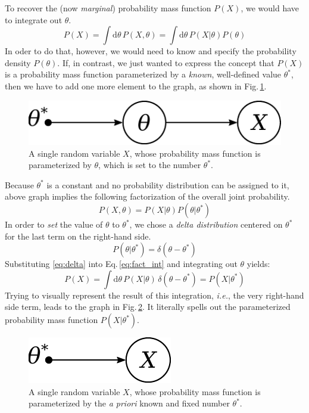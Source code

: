 \documentclass[]{report}
\begin{document}
To recover the (now \emph{marginal}) probability mass function $P(X)$, we would have to integrate out $\theta$.
\begin{equation} \label{eq:int}
P(X)
= 
\int \mathrm{d}\theta \,
	P( X, \theta )
= 
\int\mathrm{d}\theta \,
	P( X | \theta )
	P( \theta )
\end{equation}
In oder to do that, however, we would need to know and specify the probability density $P(\theta)$. If, in contrast, we just wanted to express the concept that $P(X)$ is a probability mass function parameterized by a \emph{known}, well-defined value $\theta^*$, then we have to add one more element to the graph, as shown in Fig.\,\ref{fig:1var1param1const}.
\begin{figure}[h]
	\centering
	\includegraphics[scale=0.5]{1var_1param_1const}
	\caption{A single random variable $X$, whose probability mass function is parameterized by $\theta$, which is set to the number $\theta^*$.}
	\label{fig:1var1param1const}
\end{figure}
Because $\theta^*$ is a constant and no probability distribution can be assigned to it, above graph implies the following factorization of the overall joint probability.
\begin{equation} \label{eq:fact_int}
P( X, \theta )
=
P( X | \theta )
P( \theta | \theta^* )
\end{equation}
In order to \emph{set} the value of $\theta$ to $\theta^*$, we chose a \emph{delta distribution} centered on $\theta^*$ for the last term on the right-hand side.
\begin{equation} \label{eq:delta}
P( \theta | \theta^* )
=
\delta( \theta - \theta^* )
\end{equation}
Substituting \ref{eq:delta} into Eq.\,\ref{eq:fact_int} and integrating out $\theta$ yields:
\begin{equation} \label{eq:param}
P(X)
=
\int \mathrm{d}\theta \,
	P( X | \theta ) \,
	\delta( \theta - \theta^* )
= 
P( X | \theta^* )
\end{equation}
Trying to visually represent the result of this integration, \textit{i.e.}, the very right-hand side term, leads to the graph in Fig.\,\ref{fig:1var1const}. It literally spells out the parameterized probability mass function $P( X | \theta^* ) $.
\begin{figure}[h]
	\centering
	\includegraphics[scale=0.5]{1var_1const}
	\caption{A single random variable $X$, whose probability mass function is parameterized by the \emph{a priori} known and fixed number $\theta^*$.}
	\label{fig:1var1const}
\end{figure}
\end{document}
